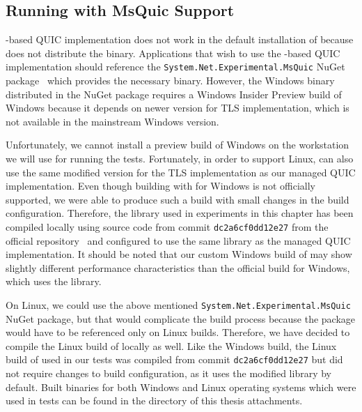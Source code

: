 \subsection{Running with MsQuic Support}

\libmsquic{}-based QUIC implementation does not work in the default installation of \dotnet{}
because \dotnet{} does not distribute the \libmsquic{} binary. Applications that wish to use the
\libmsquic{}-based QUIC implementation should reference the
\texttt{System.Net\allowbreak{}.Experimental.MsQuic} NuGet
package~\cite{SystemNetQuicExperimentalMsquic} which provides the necessary \libmsquic{} binary.
However, the Windows \libmsquic{} binary distributed in the NuGet package requires a Windows Insider
Preview build of Windows because it depends on newer \libschannel{} version for TLS implementation,
which is not available in the mainstream Windows version.

Unfortunately, we cannot install a preview build of Windows on the workstation we will use for
running the tests. Fortunately, in order to support Linux, \libmsquic{} can also use the same
modified \libopenssl{} version for the TLS implementation as our managed QUIC implementation. Even
though building \libmsquic{} with \libopenssl{} for Windows is not officially supported, we were
able to produce such a build with small changes in the \libmsquic{} build configuration. Therefore,
the \libmsquic{} library used in experiments in this chapter has been compiled locally using source
code from commit \texttt{dc2a6cf0dd12e27} from the official \libmsquic{}
repository~\cite{msquicGithub} and configured to use the same \libopenssl{} library as the managed
QUIC implementation. It should be noted that our custom Windows build of \libmsquic{} may show
slightly different performance characteristics than the official build for Windows, which uses the
\libschannel{} library.

On Linux, we could use the above mentioned
\texttt{System.Net\allowbreak{}.Experimental.\allowbreak{}MsQuic} NuGet package, but that would
complicate the build process because the package would have to be referenced only on Linux builds.
Therefore, we have decided to compile the Linux build of \libmsquic{} locally as well. Like the
Windows build, the Linux build of \libmsquic{} used in our tests was compiled from commit
\texttt{dc2a6cf0dd12e27} but did not require changes to build configuration, as it uses the modified
\libopenssl{} library by default. Built \libmsquic{} binaries for both Windows and Linux operating
systems which were used in tests can be found in the  directory of
this thesis attachments.

